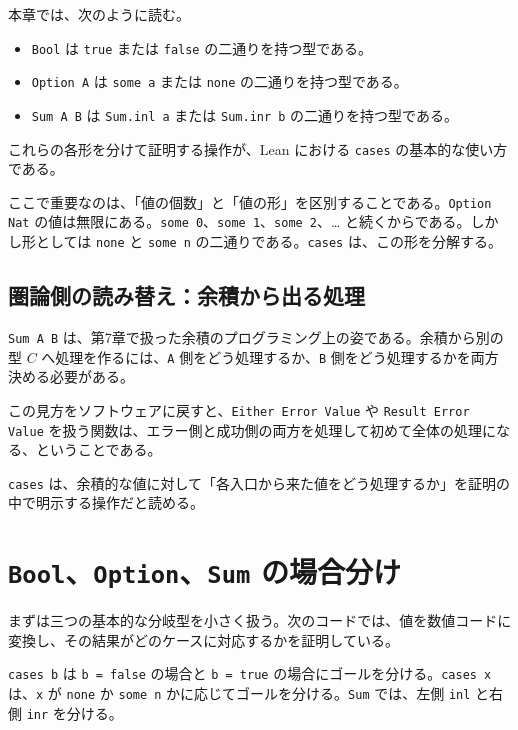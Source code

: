 \begin{definitionbox}
本章では、次のように読む。
\begin{itemize}
\item \texttt{Bool} は \texttt{true} または \texttt{false} の二通りを持つ型である。
\item \texttt{Option A} は \texttt{some a} または \texttt{none} の二通りを持つ型である。
\item \texttt{Sum A B} は \texttt{Sum.inl a} または \texttt{Sum.inr b} の二通りを持つ型である。
\end{itemize}
これらの各形を分けて証明する操作が、Lean における \texttt{cases} の基本的な使い方である。
\end{definitionbox}

ここで重要なのは、「値の個数」と「値の形」を区別することである。\texttt{Option Nat} の値は無限にある。\texttt{some 0}、\texttt{some 1}、\texttt{some 2}、\ldots{} と続くからである。しかし形としては \texttt{none} と \texttt{some n} の二通りである。\texttt{cases} は、この形を分解する。

\subsection{圏論側の読み替え：余積から出る処理}

\texttt{Sum A B} は、第7章で扱った余積のプログラミング上の姿である。余積から別の型 \(C\) へ処理を作るには、\texttt{A} 側をどう処理するか、\texttt{B} 側をどう処理するかを両方決める必要がある。

この見方をソフトウェアに戻すと、\texttt{Either Error Value} や \texttt{Result Error Value} を扱う関数は、エラー側と成功側の両方を処理して初めて全体の処理になる、ということである。

\begin{intuitionbox}
\texttt{cases} は、余積的な値に対して「各入口から来た値をどう処理するか」を証明の中で明示する操作だと読める。
\end{intuitionbox}

\section{\texttt{Bool}、\texttt{Option}、\texttt{Sum} の場合分け}

まずは三つの基本的な分岐型を小さく扱う。次のコードでは、値を数値コードに変換し、その結果がどのケースに対応するかを証明している。

\begin{leanbox}
\texttt{cases b} は \texttt{b = false} の場合と \texttt{b = true} の場合にゴールを分ける。\texttt{cases x} は、\texttt{x} が \texttt{none} か \texttt{some n} かに応じてゴールを分ける。\texttt{Sum} では、左側 \texttt{inl} と右側 \texttt{inr} を分ける。
\end{leanbox}

